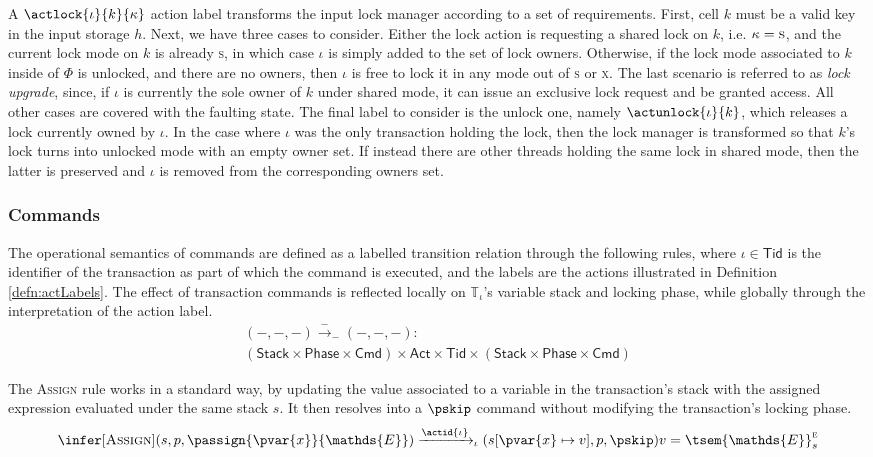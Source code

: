 A $\actlock{\iota}{k}{\kappa}$ action label transforms the input lock manager according to a set of requirements. First, cell $k$ must be a valid key in the input storage $h$. Next, we have three cases to consider. Either the lock action is requesting a shared lock on $k$, i.e. $\kappa = \textsc{s}$, and the current lock mode on $k$ is already \textsc{s}, in which case $\iota$ is simply added to the set of lock owners. Otherwise, if the lock mode associated to $k$ inside of $\Phi$ is unlocked, and there are no owners, then $\iota$ is free to lock it in any mode out of \textsc{s} or \textsc{x}. The last scenario is referred to as \textit{lock upgrade}, since, if $\iota$ is currently the sole owner of $k$ under shared mode, it can issue an exclusive lock request and be granted access. All other cases are covered with the faulting state. The final label to consider is the unlock one, namely $\actunlock{\iota}{k}$, which releases a lock currently owned by $\iota$. In the case where $\iota$ was the only transaction holding the lock, then the lock manager is transformed so that $k$'s lock turns into unlocked mode with an empty owner set. If instead there are other threads holding the same lock in shared mode, then the latter is preserved and $\iota$ is removed from the corresponding owners set.

\subsubsection{Commands}

\label{sec:opSemCmd2pl}
	
The operational semantics of commands are defined as a labelled transition relation through the following rules, where $\iota \in \mathsf{Tid}$ is the identifier of the transaction as part of which the command is executed, and the labels are the actions illustrated in Definition \ref{defn:actLabels}. The effect of transaction commands is reflected locally on $\mathds{T}_\iota$'s variable stack and locking phase, while globally through the interpretation of the action label.
\begin{gather*}
	(-, -, -) \xrightarrow{-}_- (-, -, -) : \\
	\left( \mathsf{Stack} \times \mathsf{Phase} \times \mathsf{Cmd} \right)
	\times \mathsf{Act} \times \mathsf{Tid} \times
	\left( \mathsf{Stack} \times \mathsf{Phase} \times \mathsf{Cmd} \right)
\end{gather*}

The \textsc{Assign} rule works in a standard way, by updating the value associated to a variable in the transaction's stack with the assigned expression evaluated under the same stack $s$. It then resolves into a $\pskip$ command without modifying the transaction's locking phase.
\[
\infer[\textsc{Assign}]
{
	(s, p, \passign{\pvar{x}}{\mathds{E}})
	\xrightarrow{\actid{\iota}}_\iota
	(s[\pvar{x} \mapsto v], p, \pskip)
}
{
	v = \tsem{\mathds{E}}^\textsc{e}_s
}
\]

